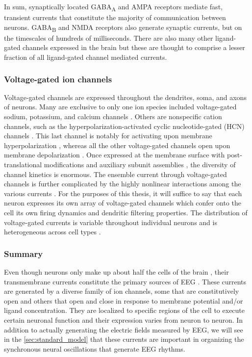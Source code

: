 In sum, synaptically located GABA\textsubscript{A} and AMPA receptors mediate fast, transient currents that constitute the majority of communication between neurons. GABA\textsubscript{B} and NMDA receptors also generate synaptic currents, but on the timescales of hundreds of milliseconds. There are also many other ligand-gated channels expressed in the brain but these are thought to comprise a lesser fraction of all ligand-gated channel mediated currents.

\subsubsection{Voltage-gated ion channels} \label{sec:I_V}
Voltage-gated channels are expressed throughout the dendrites, soma, and axons of neurons. Many are exclusive to only one ion species included voltage-gated sodium, potassium, and calcium channels \cite{hille1992ionic}. Others are nonspecific cation channels, such as the hyperpolarization-activated cyclic nucleotide-gated (HCN) channels \cite{He2014}. This last channel is notably for activating upon membrane hyperpolarization \cite{He2014}, whereas all the other voltage-gated channels open upon membrane depolarization \cite{hille1992ionic}. Once expressed at the membrane surface with post-translational modifications \cite{Schulz2008} and auxiliary subunit assemblies \cite{Isom1994}, the diversity of channel kinetics is enormous. The ensemble current through voltage-gated channels is further complicated by the highly nonlinear interactions among the various currents \cite{Izhikevich2006}. For the purposes of this thesis, it will suffice to say that each neuron expresses its own array of voltage-gated channels which confer onto the cell its own firing dynamics and dendritic filtering properties. The distribution of voltage-gated currents is variable throughout individual neurons \cite{Lai2006} and is heterogeneous across cell types \cite{Berg2021,Scala2021}.

\subsubsection{Summary}
Even though neurons only make up about half the cells of the brain \cite{Azevedo2009}, their transmembrane currents constitute the primary sources of EEG \cite{Buzsaki2012}. These currents are generated by a diverse family of ion channels, some that are constitutively open and others that open and close in response to membrane potential and/or ligand concentration. They are localized to specific regions of the cell to execute certain neuronal function and their expression varies from neuron to neuron. In addition to actually generating the electric fields measured by EEG, we will see in the \autoref{sec:standard_model} that these currents are important in organizing the synchronous neural oscillations that generate EEG rhythms.


